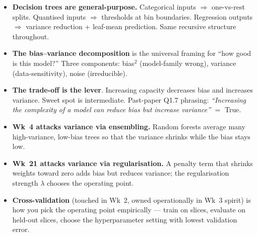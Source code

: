 \documentclass[11pt, a4paper]{article}
\begin{document}
\begin{tldrbox}
\begin{itemize}[leftmargin=*]
  \item \textbf{Decision trees are general-purpose.} Categorical inputs $\Rightarrow$ one-vs-rest splits. Quantised inputs $\Rightarrow$ thresholds at bin boundaries. Regression outputs $\Rightarrow$ variance reduction + leaf-mean prediction. Same recursive structure throughout.
  \item \textbf{The bias--variance decomposition} is the universal framing for ``how good is this model?'' Three components: bias$^2$ (model-family wrong), variance (data-sensitivity), noise (irreducible).
  \item \textbf{The trade-off is the lever}. Increasing capacity decreases bias and increases variance. Sweet spot is intermediate. Past-paper Q1.7 phrasing: \emph{``Increasing the complexity of a model can reduce bias but increase variance''} $=$ True.
  \item \textbf{Wk~4 attacks variance via ensembling.} Random forests average many high-variance, low-bias trees so that the variance shrinks while the bias stays low.
  \item \textbf{Wk~21 attacks variance via regularisation.} A penalty term that shrinks weights toward zero adds bias but reduces variance; the regularisation strength $\lambda$ chooses the operating point.
  \item \textbf{Cross-validation} (touched in Wk~2, owned operationally in Wk~3 spirit) is how you pick the operating point empirically — train on slices, evaluate on held-out slices, choose the hyperparameter setting with lowest validation error.
\end{itemize}
\end{tldrbox}
\end{document}
